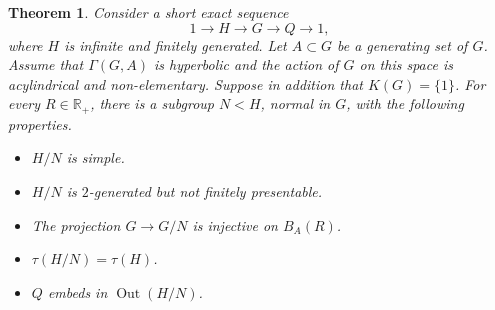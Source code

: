 \documentclass[11pt]{article}
\newtheorem{theorem}{Theorem}[section]
\theoremstyle{definition}
\newcommand{\Out}{\operatorname{Out}}
\begin{document}
\begin{theorem}
\label{thm:general}
Consider a short exact sequence
\begin{equation*}
1 \to H \to G \to Q \to 1,
\end{equation*}
where $H$ is infinite and finitely generated.
Let $A \subset G$ be a generating set of $G$.
Assume that $\Gamma(G,A)$ is hyperbolic and the action of $G$ on this space is acylindrical and non-elementary.
Suppose in addition that $K(G) = \{1\}$.
For every $R \in \mathbb R_+$, there is a subgroup $N < H$, normal in $G$, with the following properties.
\begin{itemize}
\item $H/N$ is simple.
\item $H/N$ is $2$-generated but not finitely presentable.
\item The projection $G \to G/N$ is injective on $B_A(R)$.
\item $\tau(H/N) = \tau(H)$.
\item $Q$ embeds in $\Out(H/N)$.
\end{itemize}
\end{theorem}
\end{document}
